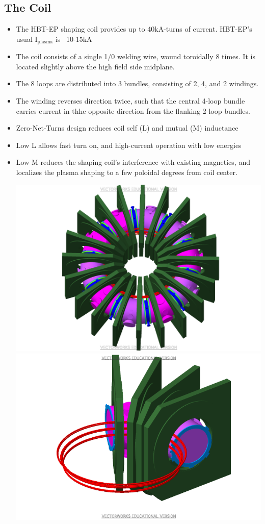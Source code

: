 \documentclass{article}
\begin{document}
\begin{multicols}{5}
\subsection{The Coil}
\begin{itemize}
\item The HBT-EP shaping coil provides up to 40kA-turns of current.  HBT-EP's usual I$_{\mbox{plasma}}$ is ~10-15kA
\item The coil consists of a single 1$/$0 welding wire, wound toroidally 8 times. It is located slightly above the high field side midplane.
\item The 8 loops are distributed into 3 bundles, consisting of 2, 4, and 2 windings.
\item The winding reverses direction twice, such that the central 4-loop bundle carries current in thhe opposite direction from the flanking 2-loop bundles.
\item Zero-Net-Turns design reduces coil self (L) and mutual (M) inductance
\item Low L allows fast turn on, and high-current operation with low energies
\item Low M reduces the shaping coil's interference with existing magnetics, and localizes the plasma shaping to a few poloidal degrees from coil center.\\
\begin{center}
\columnbreak
\includegraphics[width=0.9\columnwidth]{HBT-EP_Full2.pdf}
\includegraphics[width=0.9\columnwidth]{HBT-EP_Section.pdf}\\

\end{center}
\end{itemize}
\end{multicols}
\end{document}
